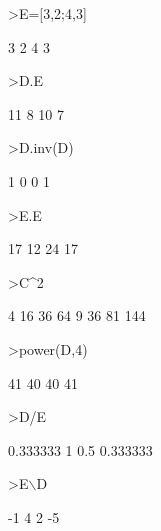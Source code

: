 \documentclass[12pt,arial,letterpaper]{book}
\begin{document}
\begin{eulercomment}
\begin{eulercomment}
\begin{euleroutput}
\end{euleroutput}
\begin{eulerprompt}
>E=[3,2;4,3]
\end{eulerprompt}
\begin{euleroutput}
              3             2 
              4             3 
\end{euleroutput}
\begin{eulerprompt}
>D.E
\end{eulerprompt}
\begin{euleroutput}
             11             8 
             10             7 
\end{euleroutput}
\begin{eulerprompt}
>D.inv(D)
\end{eulerprompt}
\begin{euleroutput}
              1             0 
              0             1 
\end{euleroutput}
\begin{eulerprompt}
>E.E
\end{eulerprompt}
\begin{euleroutput}
             17            12 
             24            17 
\end{euleroutput}
\begin{eulerprompt}
>C^2
\end{eulerprompt}
\begin{euleroutput}
              4            16            36            64 
              9            36            81           144 
\end{euleroutput}
\begin{eulerprompt}
>power(D,4)
\end{eulerprompt}
\begin{euleroutput}
             41            40 
             40            41 
\end{euleroutput}
\begin{eulerprompt}
>D/E
\end{eulerprompt}
\begin{euleroutput}
       0.333333             1 
            0.5      0.333333 
\end{euleroutput}
\begin{eulerprompt}
>E\(\backslash\)D
\end{eulerprompt}
\begin{euleroutput}
             -1             4 
              2            -5 
\end{euleroutput}
\begin{eulerprompt}

\end{eulerprompt}
\end{eulercomment}
\end{eulercomment}
\end{document}
